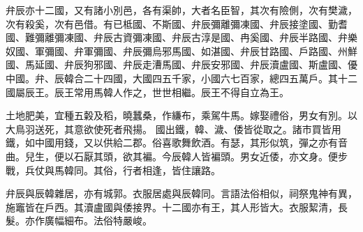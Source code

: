 \begin{pinyinscope}
 
 
 弁辰亦十二國，又有諸小別邑，各有渠帥，大者名臣智，其次有險側，次有樊濊，次有殺奚，次有邑借。有已柢國、不斯國、弁辰彌離彌凍國、弁辰接塗國、勤耆國、難彌離彌凍國、弁辰古資彌凍國、弁辰古淳是國、冉奚國、弁辰半路國、弁樂奴國、軍彌國、弁軍彌國、弁辰彌烏邪馬國、如湛國、弁辰甘路國、戶路國、州鮮國、馬延國、弁辰狗邪國、弁辰走漕馬國、弁辰安邪國、弁辰瀆盧國、斯盧國、優中國。弁、辰韓合二十四國，大國四五千家，小國六七百家，總四五萬戶。其十二國屬辰王。辰王常用馬韓人作之，世世相繼。辰王不得自立為王。
 
 
 土地肥美，宜種五糓及稻，曉蠶桑，作縑布，乘駕牛馬。嫁娶禮俗，男女有別。以大鳥羽送死，其意欲使死者飛揚。
 國出鐵，韓、濊、倭皆從取之。諸巿買皆用鐵，如中國用錢，又以供給二郡。俗喜歌舞飲酒。有瑟，其形似筑，彈之亦有音曲。兒生，便以石厭其頭，欲其褊。今辰韓人皆褊頭。男女近倭，亦文身。便步戰，兵仗與馬韓同。其俗，行者相逢，皆住讓路。
 
 
 
 
 弁辰與辰韓雜居，亦有城郭。衣服居處與辰韓同。言語法俗相似，祠祭鬼神有異，施竈皆在戶西。其瀆盧國與倭接界。十二國亦有王，其人形皆大。衣服絜清，長髮。亦作廣幅細布。法俗特嚴峻。
 
 
\end{pinyinscope}